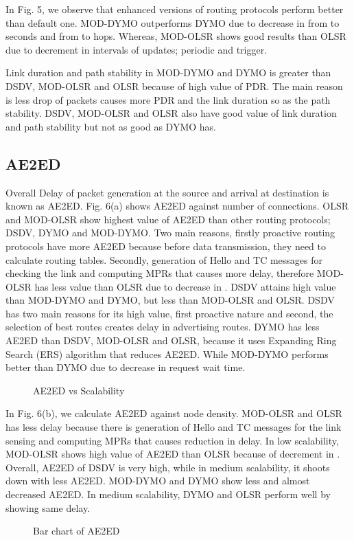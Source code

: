 \documentclass[journal]{IEEEtran}
\begin{document}
In Fig. 5, we observe that enhanced versions of routing protocols perform better than default one. MOD-DYMO outperforms DYMO due to decrease in  from  to  seconds and  from  to  hops. Whereas, MOD-OLSR shows good results than OLSR due to decrement in intervals of updates; periodic and trigger.

Link duration and path stability in MOD-DYMO and DYMO is greater than DSDV, MOD-OLSR and OLSR because of high value of PDR. The main reason is less drop of packets causes more PDR and the link duration so as the path stability. DSDV, MOD-OLSR and OLSR also have good value of link duration and path stability but not as good as DYMO has.

\subsection{AE2ED}
Overall Delay of packet generation at the source and arrival at destination is known as AE2ED. Fig. 6(a) shows AE2ED against number of connections. OLSR and MOD-OLSR show highest value of AE2ED than other routing protocols; DSDV, DYMO and MOD-DYMO. Two main reasons, firstly proactive routing protocols have more AE2ED because before data transmission, they need to calculate routing tables. Secondly, generation of Hello and TC messages for checking the link and computing MPRs that causes more delay, therefore MOD-OLSR has less value than OLSR due to decrease in . DSDV attains high value than MOD-DYMO and DYMO, but less than MOD-OLSR and OLSR. DSDV has two main reasons for its high value, first proactive nature and second, the selection of best routes creates delay in advertising routes. DYMO has less AE2ED than DSDV, MOD-OLSR and OLSR, because it uses Expanding Ring Search (ERS) algorithm that reduces AE2ED. While MOD-DYMO performs better than DYMO due to decrease in request wait time.
\begin{figure}[h]
  \centering
 \caption{AE2ED vs Scalability}
\end{figure}

In Fig. 6(b), we calculate AE2ED against node density. MOD-OLSR and OLSR has less delay because there is generation of Hello and TC messages for the link sensing and computing MPRs that causes reduction in delay. In low scalability, MOD-OLSR shows high value of AE2ED than OLSR because of decrement in . Overall, AE2ED of DSDV is very high, while in medium scalability, it shoots down with less AE2ED. MOD-DYMO and DYMO show less and almost decreased AE2ED. In medium scalability, DYMO and OLSR perform well by showing same delay.
\begin{figure}[h]
  \centering
 \caption{Bar chart of AE2ED }
\end{figure}
\end{document}
